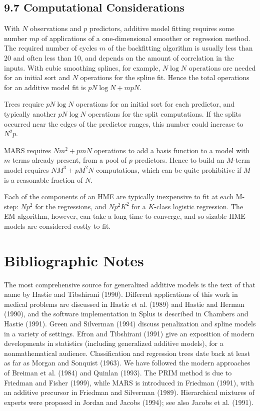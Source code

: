 \documentclass[10pt]{article}
\begin{document}
\subsection*{9.7 Computational Considerations}
With $N$ observations and $p$ predictors, additive model fitting requires some number $m p$ of applications of a one-dimensional smoother or regression method. The required number of cycles $m$ of the backfitting algorithm is usually less than 20 and often less than 10, and depends on the amount of correlation in the inputs. With cubic smoothing splines, for example, $N \log N$ operations are needed for an initial sort and $N$ operations for the spline fit. Hence the total operations for an additive model fit is $p N \log N+ m p N$.

Trees require $p N \log N$ operations for an initial sort for each predictor, and typically another $p N \log N$ operations for the split computations. If the splits occurred near the edges of the predictor ranges, this number could increase to $N^{2} p$.

MARS requires $N m^{2}+p m N$ operations to add a basis function to a model with $m$ terms already present, from a pool of $p$ predictors. Hence to build an $M$-term model requires $N M^{3}+p M^{2} N$ computations, which can be quite prohibitive if $M$ is a reasonable fraction of $N$.

Each of the components of an HME are typically inexpensive to fit at each M-step: $N p^{2}$ for the regressions, and $N p^{2} K^{2}$ for a $K$-class logistic regression. The EM algorithm, however, can take a long time to converge, and so sizable HME models are considered costly to fit.

\section*{Bibliographic Notes}
The most comprehensive source for generalized additive models is the text of that name by Hastie and Tibshirani (1990). Different applications of this work in medical problems are discussed in Hastie et al. (1989) and Hastie and Herman (1990), and the software implementation in Splus is described in Chambers and Hastie (1991). Green and Silverman (1994) discuss penalization and spline models in a variety of settings. Efron and Tibshirani (1991) give an exposition of modern developments in statistics (including generalized additive models), for a nonmathematical audience. Classification and regression trees date back at least as far as Morgan and Sonquist (1963). We have followed the modern approaches of Breiman et al. (1984) and Quinlan (1993). The PRIM method is due to Friedman and Fisher (1999), while MARS is introduced in Friedman (1991), with an additive precursor in Friedman and Silverman (1989). Hierarchical mixtures of experts were proposed in Jordan and Jacobs (1994); see also Jacobs et al. (1991).
\end{document}
